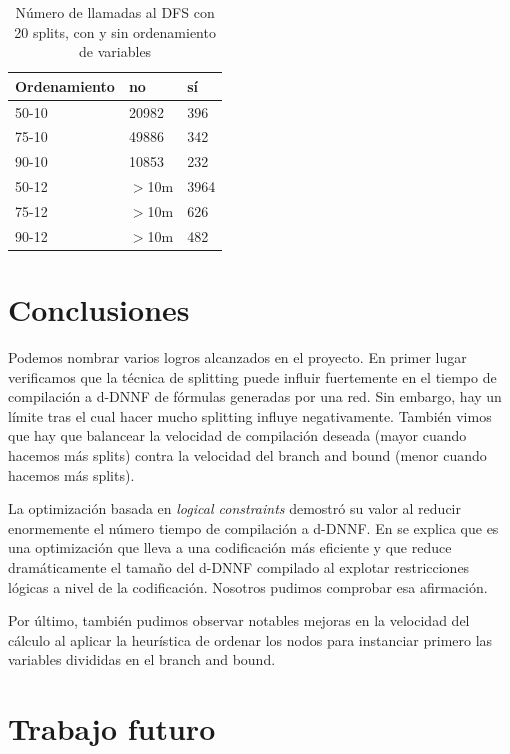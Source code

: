 \documentclass[11pt, letterpaper]{article}
\begin{document}
\begin{table}
\begin{center}
  \begin{tabular}{l | l | l}
    \hline
    Ordenamiento & no & sí \\
    \hline
    50-10 & 20982 & 396 \\
    75-10 & 49886 & 342 \\
    90-10 & 10853 & 232 \\
    50-12 & $>$10m & 3964 \\
    75-12 & $>$10m & 626 \\
    90-12 & $>$10m & 482 \\
  \end{tabular}
  \caption{Número de llamadas al DFS con 20 splits, con y sin ordenamiento de variables}
\end{center}
\end{table}

\section{Conclusiones}

Podemos nombrar varios logros alcanzados en el proyecto. En primer lugar
verificamos que la técnica de splitting puede influir fuertemente en el tiempo
de compilación a d-DNNF de fórmulas generadas por una red. Sin embargo,
hay un límite tras el cual hacer mucho splitting influye negativamente.
También vimos que hay
que balancear la velocidad de compilación deseada (mayor cuando hacemos más
splits) contra la velocidad del branch and bound (menor cuando hacemos más
splits).

La optimización basada en \emph{logical constraints} demostró su valor al
reducir enormemente el número tiempo de compilación a d-DNNF. En
\cite{Darwiche01alogical} se explica que es una optimización que lleva a una
codificación más eficiente y que reduce dramáticamente el tamaño del d-DNNF
compilado al explotar restricciones lógicas a nivel de la codificación.
Nosotros pudimos comprobar esa
afirmación.

Por último, también pudimos observar notables mejoras en la velocidad del cálculo al
aplicar la heurística de ordenar los nodos para instanciar primero las variables
divididas en el branch and bound.

\section{Trabajo futuro}
\end{document}

